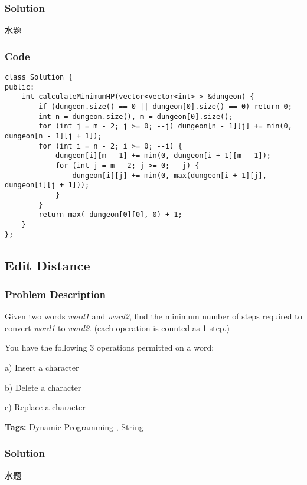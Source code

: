\documentclass{article}
\begin{document}
\begin{CJK*}{UTF8}{gkai}

\subsubsection*{Solution}
水题

\subsubsection*{Code}
\begin{lstlisting}
class Solution {
public:
    int calculateMinimumHP(vector<vector<int> > &dungeon) {
        if (dungeon.size() == 0 || dungeon[0].size() == 0) return 0;
        int n = dungeon.size(), m = dungeon[0].size();
        for (int j = m - 2; j >= 0; --j) dungeon[n - 1][j] += min(0, dungeon[n - 1][j + 1]);
        for (int i = n - 2; i >= 0; --i) {
            dungeon[i][m - 1] += min(0, dungeon[i + 1][m - 1]);
            for (int j = m - 2; j >= 0; --j) {
                dungeon[i][j] += min(0, max(dungeon[i + 1][j], dungeon[i][j + 1]));
            }
        }
        return max(-dungeon[0][0], 0) + 1;
    }
}; 
\end{lstlisting}


\subsection{ Edit Distance }
\label{ Edit Distance }

\subsubsection*{Problem Description}
Given two words \emph{word1} and \emph{word2}, find the minimum number of steps required to convert \emph{word1} to \emph{word2}. (each operation is counted as 1 step.)

You have the following 3 operations permitted on a word:

a) Insert a character


b) Delete a character


c) Replace a character


\textbf{Tags: }
\hyperref[ Dynamic Programming ]{ Dynamic Programming },  \hyperref[ String ]{ String }



\subsubsection*{Solution}
水题


\end{CJK*}
\end{document}
